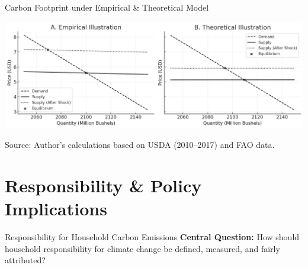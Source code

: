\documentclass{beamer}
\begin{document}
\begin{frame}{Carbon Footprint under Empirical \& Theoretical Model}
\footnotesize
\pause
\vspace{-3.0em}
\begin{center}
\includegraphics[width=0.9\linewidth]{Hakenes illustration.png}
\end{center}

\pause
\footnotesize
\begin{table}[h!]
\centering
{}
\end{table}


\vspace{0.3em}
\scriptsize Source: Author's calculations based on USDA (2010--2017) and FAO data.


\vspace{0.5em}



\end{frame}


\section{Responsibility \& Policy Implications}
\begin{frame}{Responsibility for Household Carbon Emissions}
\footnotesize
\vspace{-2.5em}
\textbf{Central Question:}  
How should household responsibility for climate change be defined, measured, and fairly attributed?\\
  \end{frame}
\end{document}
